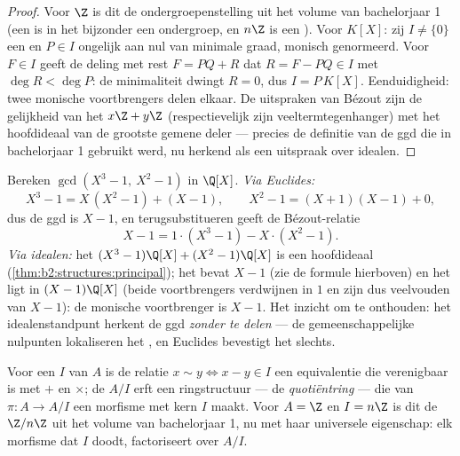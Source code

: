 \begin{proof}
Voor $\Z$ is dit de ondergroepenstelling uit het volume van
bachelorjaar 1 (een  is in het bijzonder een ondergroep, en
$n\Z$ is een ). Voor $K[X]$: zij $I \neq \{0\}$ een 
en $P \in I$ ongelijk aan nul van minimale graad, monisch
genormeerd. Voor $F \in I$ geeft de deling met rest $F = PQ + R$
dat $R = F - PQ \in I$ met $\deg R < \deg P$: de minimaliteit
dwingt $R = 0$, dus $I = P\,K[X]$. Eenduidigheid: twee monische
voortbrengers delen elkaar. De uitspraken van Bézout zijn de
gelijkheid van het  $x\Z + y\Z$ (respectievelijk zijn
veeltermtegenhanger) met het hoofdideaal van de grootste gemene
deler --- precies de definitie van de ggd die in bachelorjaar 1
gebruikt werd, nu herkend als een uitspraak over idealen.
\end{proof}

\begin{example}\label{ex:b2:structures:polygcd}
Bereken $\gcd(X^3 - 1,\ X^2 - 1)$ in $\Q[X]$. \emph{Via Euclides:}
\[
X^3 - 1 = X\,(X^2 - 1) + (X - 1),
\qquad
X^2 - 1 = (X + 1)(X - 1) + 0 ,
\]
dus de ggd is $X - 1$, en terugsubstitueren geeft de
Bézout-relatie
\[
X - 1 = 1\cdot(X^3 - 1) - X\cdot(X^2 - 1).
\]
\emph{Via idealen:} het  $(X^3 - 1)\Q[X] + (X^2 - 1)\Q[X]$
is een hoofdideaal (\cref{thm:b2:structures:principal}); het
bevat $X - 1$ (zie de formule hierboven) en het ligt in $(X -
1)\Q[X]$ (beide voortbrengers verdwijnen in $1$ en zijn dus
veelvouden van $X - 1$): de monische voortbrenger is $X - 1$. Het
inzicht om te onthouden: het idealenstandpunt herkent de ggd
\emph{zonder te delen} --- de gemeenschappelijke nulpunten
lokaliseren het , en Euclides bevestigt het slechts.
\end{example}

\begin{definition}\label{def:b2:structures:quotientring}
Voor een  $I$ van $A$ is de relatie $x \sim y \iff x - y \in
I$ een equivalentie die verenigbaar is met $+$ en $\times$; de
 $A/I$ erft een ringstructuur --- de
\emph{quotiëntring} --- die van $\pi \colon A
\to A/I$ een morfisme met kern $I$ maakt. Voor $A = \Z$ en $I =
n\Z$ is dit de $\Z/n\Z$ uit het volume van bachelorjaar 1, nu met
haar universele eigenschap: elk morfisme dat $I$ doodt,
factoriseert over $A/I$.
\end{definition}

